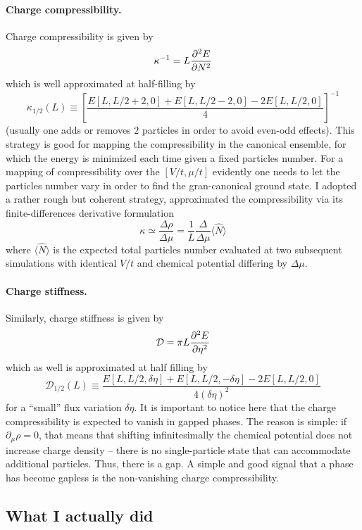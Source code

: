 \paragraph{Charge compressibility.}
Charge compressibility is given by
\[
	\kappa^{-1} = L \pdv[2]{E}{N}
\]
which is well approximated at half-filling by
\begin{equation}\label{eq:charge-compressibility-approximation}
	\kappa_{1/2}(L) \equiv \left[
		\frac{E[L,L/2+2,0]+E[L,L/2-2,0]-2E[L,L/2,0]}{4}
	\right]^{-1}
\end{equation}
(usually one adds or removes $2$ particles in order to avoid even-odd effects). This strategy is good for mapping the compressibility in the canonical ensemble, for which the energy is minimized each time given a fixed particles number. For a mapping of compressibility over the $[V/t,\mu/t]$ evidently one needs to let the particles number vary in order to find the gran-canonical ground state. I adopted a rather rough but coherent strategy, approximated the compressibility via its finite-differences derivative formulation
\[
	\kappa \simeq \frac{\Delta \rho}{\Delta \mu} = \frac{1}{L} \frac{\Delta}{\Delta \mu} \langle \hat N \rangle
\]
where $\langle \hat N \rangle$ is the expected total particles number evaluated at two subsequent simulations with identical $V/t$ and chemical potential differing by $\Delta \mu$.

\paragraph{Charge stiffness.}
Similarly, charge stiffness is given by
\[
	\mathcal{D} = \pi L \pdv[2]{E}{\eta}
\]
which as well is approximated at half filling by
\begin{equation}\label{eq:charge-stiffness-approximation}
	\mathcal{D}_{1/2}(L) \equiv
	\frac{E[L,L/2,\delta\eta]+E[L,L/2,-\delta\eta]-2E[L,L/2,0]}{4(\delta\eta)^2}
\end{equation}
for a ``small'' flux variation $\delta\eta$. It is important to notice here that the charge compressibility is expected to vanish in gapped phases. The reason is simple: if $\partial_\mu \rho=0$, that means that shifting infinitesimally the chemical potential does not increase charge density -- there is no single-particle state that can accommodate additional particles. Thus, there is a gap. A simple and good signal that a phase has become gapless is the non-vanishing charge compressibility.

\subsection{What I actually did}

